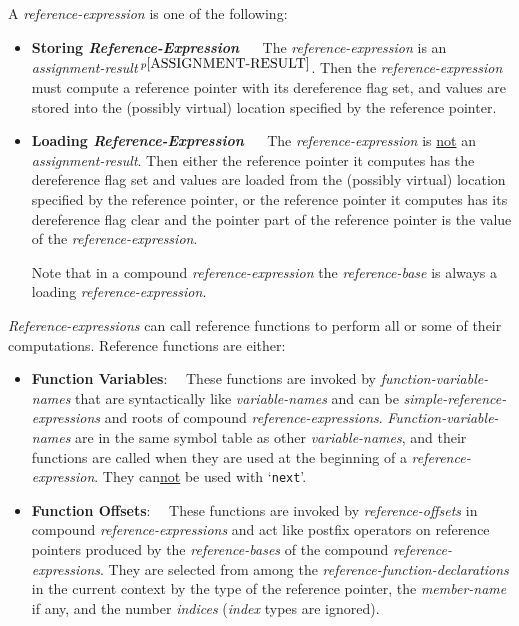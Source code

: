 \documentclass[12pt]{article}
\newcommand{\key}[1]{{\rm \bfseries #1}}
\newcommand{\pagnote}[1]{$\,^{p\pageref{#1}}$}
\begin{document}
A {\em reference-expression} is one of the following:
\begin{itemize}
\item \key{Storing {\em Reference-Expression}} ~~
The {\em reference-expression} is an
{\em assignment-re\-sult}\pagnote{ASSIGNMENT-RESULT}.
Then the {\em reference-expression} must compute a reference pointer with its
dereference flag set, and values
are stored into the (possibly virtual)
location specified by the reference pointer.
\item \key{Loading {\em Reference-Expression}} ~~
The {\em reference-expression} is \underline{not} an
{\em assignment-result}.
Then either the reference pointer it computes has the
dereference flag set and values are loaded from the
(possibly virtual) location specified by the reference pointer,
or the reference pointer it computes
has its dereference flag clear and the pointer part of the reference pointer
is the value of the {\em reference-expression}.

Note that in a compound {\em reference-expression} the {\em reference-base}
is always a loading {\em reference-expression}.
\end{itemize}

{\em Reference-expressions} can call reference functions to perform
all or some of their computations.  Reference functions are either:
\begin{itemize}
\item\key{Function Variables}:~~
These functions
are invoked by {\em function-variable-names} that are syntactically
like {\em variable-names} and can be {\em simple-reference-expressions} and
roots of compound {\em reference-expressions}.
{\em Function-variable-names} are in the same symbol table as
other {\em variable-names}, and their functions are called when they are
used at the beginning
of a {\em reference-expression}.  They can\underline{not}
be used with `{\tt next}'.

\item\key{Function Offsets}:~~
These functions are invoked by {\em reference-offsets} in
compound {\em reference-expressions}
and act like postfix operators on
reference pointers produced by the {\em reference-bases} of the
compound {\em reference-expressions}.
They are selected from among the {\em reference-function-declarations}
in the current context by the type of the reference pointer,
the {\em member-name} if any, and the number {\em indices} ({\em index}
types are ignored).
\end{itemize}
\end{document}
